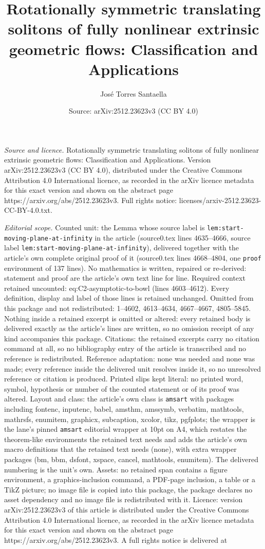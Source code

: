 \documentclass[10pt,a4paper]{amsart}
\title[Rotationally symmetric translating solitons of fully nonline]{Rotationally symmetric translating solitons of fully nonlinear extrinsic geometric flows: Classification and Applications}
\author{Jos\'e Torres Santaella}
\date{Source: arXiv:2512.23623v3 (CC BY 4.0)}
\begin{document}
\maketitle

\noindent\emph{Source and licence.} Rotationally symmetric translating solitons of fully nonlinear extrinsic geometric flows: Classification and Applications. Version arXiv:2512.23623v3 (CC BY 4.0), distributed under the Creative Commons Attribution 4.0 International licence, as recorded in the arXiv licence metadata for this exact version and shown on the abstract page https://arxiv.org/abs/2512.23623v3. Full rights notice: licenses/arxiv-2512.23623-CC-BY-4.0.txt.\par\smallskip

\noindent\textit{Editorial scope.} Counted unit: the Lemma whose source label is \texttt{lem:start-moving-plane-at-infinity} in the article (source0.tex lines 4635--4666, source label \texttt{lem:start-moving-plane-at-infinity}), delivered together with the article's own complete original proof of it (source0.tex lines 4668--4804, one \texttt{proof} environment of 137 lines). No mathematics is written, repaired or re-derived: statement and proof are the article's own text line for line. Required context retained uncounted: eq:C2-asymptotic-to-bowl (lines 4603--4612). Every definition, display and label of those lines is retained unchanged. Omitted from this package and not redistributed: 1--4602, 4613--4634, 4667--4667, 4805--5845. Nothing inside a retained excerpt is omitted or altered: every retained body is delivered exactly as the article's lines are written, so no omission receipt of any kind accompanies this package. Citations: the retained excerpts carry no citation command at all, so no bibliography entry of the article is transcribed and no reference is redistributed. Reference adaptation: none was needed and none was made; every reference inside the delivered unit resolves inside it, so no unresolved reference or citation is produced. Printed slips kept literal: no printed word, symbol, hypothesis or number of the counted statement or of its proof was altered. Layout and class: the article's own class is \texttt{amsart} with packages including fontenc, inputenc, babel, amsthm, amssymb, verbatim, mathtools, mathrsfs, enumitem, graphicx, subcaption, xcolor, tikz, pgfplots; the wrapper is the lane's pinned \texttt{amsart} editorial wrapper at 10pt on A4, which restates the theorem-like environments the retained text needs and adds the article's own macro definitions that the retained text needs (none), with extra wrapper packages (bm, bbm, dsfont, xspace, cancel, mathtools, enumitem). The delivered numbering is the unit's own. Assets: no retained span contains a figure environment, a graphics-inclusion command, a PDF-page inclusion, a table or a TikZ picture; no image file is copied into this package, the package declares no asset dependency and no image file is redistributed with it. Licence: version arXiv:2512.23623v3 of this article is distributed under the Creative Commons Attribution 4.0 International licence, as recorded in the arXiv licence metadata for this exact version and shown on the abstract page https://arxiv.org/abs/2512.23623v3. A full rights notice is delivered at 
\end{document}
